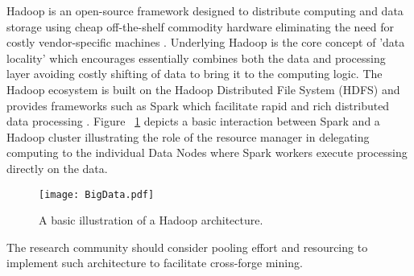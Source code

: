 Hadoop is an open-source framework designed to distribute computing and data storage using cheap off-the-shelf commodity hardware eliminating the need for costly vendor-specific machines \citep{hadoop}. Underlying Hadoop is the core concept of 'data locality' which encourages essentially combines both the data and processing layer avoiding costly shifting of data to bring it to the computing logic. The Hadoop ecosystem is built on the Hadoop Distributed File System (HDFS) and provides frameworks such as Spark which facilitate rapid and rich distributed data processing \citep{spark}. Figure ~\ref{fig:BigData} depicts a basic interaction between Spark and a Hadoop cluster illustrating the role of the resource manager in delegating computing to the individual Data Nodes where Spark workers execute processing directly on the data.

\begin{figure}[htbp!] 
\centering    
\texttt{[image: BigData.pdf]}
\caption{A basic illustration of a Hadoop architecture.}
\label{fig:BigData}
\end{figure}

The research community should consider pooling effort and resourcing to implement such architecture to facilitate cross-forge mining.
